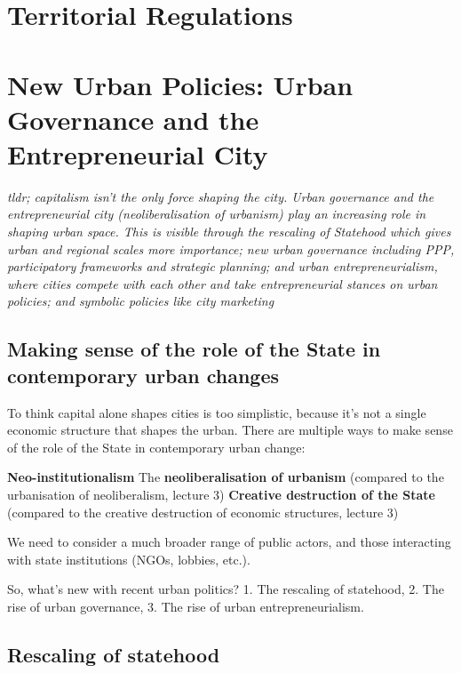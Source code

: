 \documentclass{article}
\begin{document}

\section{Territorial Regulations}

\section{New Urban Policies: Urban Governance and the Entrepreneurial City}

\textit{tldr; capitalism isn’t the only force shaping the city. Urban governance and the entrepreneurial city (neoliberalisation of urbanism) play an increasing role in shaping urban space. This is visible through the rescaling of Statehood which gives urban and regional scales more importance; new urban governance including PPP, participatory frameworks and strategic planning; and urban entrepreneurialism, where cities compete with each other and take entrepreneurial stances on urban policies; and symbolic policies like city marketing}

\subsection{Making sense of the role of the State in contemporary urban changes}

To think capital alone shapes cities is too simplistic, because it's not a single economic structure that shapes the urban.
There are multiple ways to make sense of the role of the State in contemporary urban change:

\begin{outline}
	\1 \textbf{Neo-institutionalism}
	\1 The \textbf{neoliberalisation of urbanism} (compared to the urbanisation of neoliberalism,  lecture 3)
	\1 \textbf{Creative destruction of the State} (compared to the creative destruction of economic structures, lecture 3)
\end{outline}

We need to consider a much broader range of public actors, and those interacting with state institutions (NGOs, lobbies, etc.).

So, what's new with recent urban politics? 1. The rescaling of statehood, 2. The rise of urban governance, 3. The rise of urban entrepreneurialism.

\subsection{Rescaling of statehood}
\end{document}
